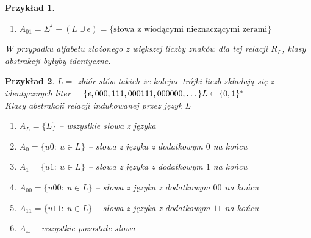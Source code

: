 \documentclass[12pt,a4paper]{article}
\newtheorem{przyklad}{Przykład}
\theoremstyle{definition}
\begin{document}
\begin{przyklad}
\begin{enumerate}
\begin{itemize}
					\begin{proof}
						Niech $u \in A_{10}$ i $v \not\in A_{10}$ wówczas $u = 1\dots$ 
						\begin{itemize}
							\item jeśli $v\ \neq \epsilon$ to znaczy $v = 0\dots $, wówczas dla $z = 1 \quad uz \in L \wedge vz \not\in L$
							\item jeśli $v = \epsilon$ to dla $z = \epsilon \quad uz \in L \wedge vz \not\in L$
							\footnote{Można skorzystać z tego że już udowodniliśmy że $\epsilon$ jest w innej klasie abstrakcji}
						\end{itemize}
					\end{proof}
				\end{itemize}
			\item $A_{01} = \Sigma^\star - (L \cup {\epsilon}) = \{ \text{słowa z wiodącymi nieznaczącymi zerami} \}$
		\end{enumerate}
		W przypadku alfabetu złożonego z większej liczby znaków dla tej relacji $R_L$, klasy abstrakcji byłyby identyczne.
	\end{przyklad}	
	
	\begin{przyklad}
		$L = $ zbiór słów takich że kolejne trójki liczb składają się z identycznych liter $ = \{\epsilon, 000, 111, 000111, 000000, \dots\}\\
		L \subset \{0, 1\}^\star$\\
		Klasy abstrakcji relacji indukowanej przez język $L$
		\begin{enumerate}
			\item $A_L = \{L\}$ -- wszystkie słowa z języka
			\item $A_0 = \{u0: ~ u\in L\}$ -- słowa z języka z dodatkowym $0$ na końcu
			\item $A_1 = \{u1: ~ u\in L\}$ -- słowa z języka z dodatkowym $1$ na końcu
			\item $A_{00} = \{u00: ~ u\in L\}$ -- słowa z języka z dodatkowym $00$ na końcu
			\item $A_{11} = \{u11: ~ u\in L\}$ -- słowa z języka z dodatkowym $11$ na końcu
			\item $A_\sim$ -- wszystkie pozostałe słowa
		\end{enumerate}
	\end{przyklad}		
	
\end{document}
